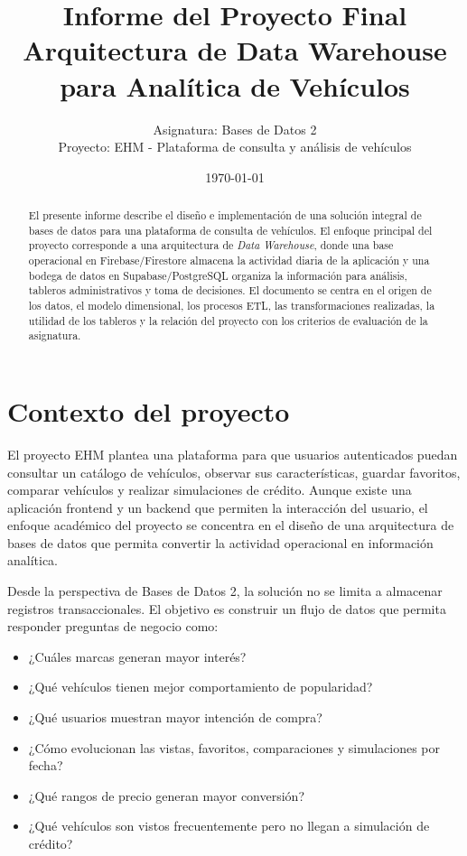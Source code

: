 \documentclass[12pt,letterpaper]{article}
\title{\textbf{Informe del Proyecto Final}\\
Arquitectura de Data Warehouse para Analítica de Vehículos}
\author{
Asignatura: Bases de Datos 2\\
Proyecto: EHM - Plataforma de consulta y análisis de vehículos
}
\date{\today}
\begin{document}
\maketitle

\begin{abstract}
El presente informe describe el diseño e implementación de una solución integral de bases de datos para una plataforma de consulta de vehículos. El enfoque principal del proyecto corresponde a una arquitectura de \textit{Data Warehouse}, donde una base operacional en Firebase/Firestore almacena la actividad diaria de la aplicación y una bodega de datos en Supabase/PostgreSQL organiza la información para análisis, tableros administrativos y toma de decisiones. El documento se centra en el origen de los datos, el modelo dimensional, los procesos ETL, las transformaciones realizadas, la utilidad de los tableros y la relación del proyecto con los criterios de evaluación de la asignatura.
\end{abstract}

\tableofcontents
\newpage

\section{Contexto del proyecto}

El proyecto EHM plantea una plataforma para que usuarios autenticados puedan consultar un catálogo de vehículos, observar sus características, guardar favoritos, comparar vehículos y realizar simulaciones de crédito. Aunque existe una aplicación frontend y un backend que permiten la interacción del usuario, el enfoque académico del proyecto se concentra en el diseño de una arquitectura de bases de datos que permita convertir la actividad operacional en información analítica.

Desde la perspectiva de Bases de Datos 2, la solución no se limita a almacenar registros transaccionales. El objetivo es construir un flujo de datos que permita responder preguntas de negocio como:

\begin{itemize}
    \item ¿Cuáles marcas generan mayor interés?
    \item ¿Qué vehículos tienen mejor comportamiento de popularidad?
    \item ¿Qué usuarios muestran mayor intención de compra?
    \item ¿Cómo evolucionan las vistas, favoritos, comparaciones y simulaciones por fecha?
    \item ¿Qué rangos de precio generan mayor conversión?
    \item ¿Qué vehículos son vistos frecuentemente pero no llegan a simulación de crédito?
\end{itemize}
\end{document}
